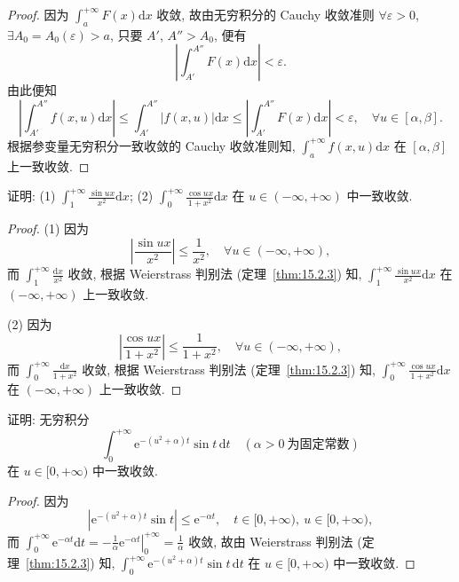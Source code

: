 \begin{proof}
因为 $\displaystyle\int_{a}^{+\infty}F(x)\mathrm{d}x$ 收敛, 故由无穷积分的 Cauchy 收敛准则 $\forall\varepsilon>0$, $\exists A_{0}=A_{0}(\varepsilon)>a$, 只要 $A'$, $A''>A_{0}$, 便有
\[
  \left|\int_{A'}^{A''}F(x)\mathrm{d}x\right|<\varepsilon.
\]
由此便知
\[
  \left|\int_{A'}^{A''}f(x,u)\mathrm{d}x\right|\leqslant\int_{A'}^{A''}|f(x,u)|\mathrm{d}x\leqslant\left|\int_{A'}^{A''}F(x)\mathrm{d}x\right|<\varepsilon,\quad\forall u\in[\alpha,\beta].
\]
根据参变量无穷积分一致收敛的 Cauchy 收敛准则知, $\displaystyle\int_{a}^{+\infty}f(x,u)\mathrm{d}x$ 在 $[\alpha,\beta]$ 上一致收敛.
\end{proof}

\begin{example}\label{ex:15.2.2}
证明: (1) $\displaystyle\int_{1}^{+\infty}\frac{\sin ux}{x^{2}}\mathrm{d}x$; (2) $\displaystyle\int_{0}^{+\infty}\frac{\cos ux}{1+x^{2}}\mathrm{d}x$ 在 $u\in(-\infty,+\infty)$ 中一致收敛.
\end{example}

\begin{proof}
(1) 因为
\[
  \left|\frac{\sin ux}{x^{2}}\right|\leqslant\frac{1}{x^{2}},\quad\forall u\in(-\infty,+\infty),
\]
而 $\displaystyle\int_{1}^{+\infty}\frac{\mathrm{d}x}{x^{2}}$ 收敛, 根据 Weierstrass 判别法 (定理~\ref{thm:15.2.3}) 知, $\displaystyle\int_{1}^{+\infty}\frac{\sin ux}{x^{2}}\mathrm{d}x$ 在 $(-\infty,+\infty)$ 上一致收敛.

(2) 因为
\[
  \left|\frac{\cos ux}{1+x^{2}}\right|\leqslant\frac{1}{1+x^{2}},\quad\forall u\in(-\infty,+\infty),
\]
而 $\displaystyle\int_{0}^{+\infty}\frac{\mathrm{d}x}{1+x^{2}}$ 收敛, 根据 Weierstrass 判别法 (定理~\ref{thm:15.2.3}) 知, $\displaystyle\int_{0}^{+\infty}\frac{\cos ux}{1+x^{2}}\mathrm{d}x$ 在 $(-\infty,+\infty)$ 上一致收敛.
\end{proof}

\begin{example}\label{ex:15.2.3}
证明: 无穷积分
\[
  \int_{0}^{+\infty}\mathrm{e}^{-(u^{2}+\alpha)t}\sin t\,\mathrm{d}t\quad(\alpha>0\ \text{为固定常数})
\]
在 $u\in[0,+\infty)$ 中一致收敛.
\end{example}

\begin{proof}
因为
\[
  \left|\mathrm{e}^{-(u^{2}+\alpha)t}\sin t\right|\leqslant\mathrm{e}^{-\alpha t},\quad t\in[0,+\infty),\ u\in[0,+\infty),
\]
而 $\displaystyle\int_{0}^{+\infty}\mathrm{e}^{-\alpha t}\mathrm{d}t=-\frac{1}{\alpha}\left.\mathrm{e}^{-\alpha t}\right|_{0}^{+\infty}=\frac{1}{\alpha}$ 收敛, 故由 Weierstrass 判别法 (定理~\ref{thm:15.2.3}) 知, $\displaystyle\int_{0}^{+\infty}\mathrm{e}^{-(u^{2}+\alpha)t}\sin t\,\mathrm{d}t$ 在 $u\in[0,+\infty)$ 中一致收敛.
\end{proof}

